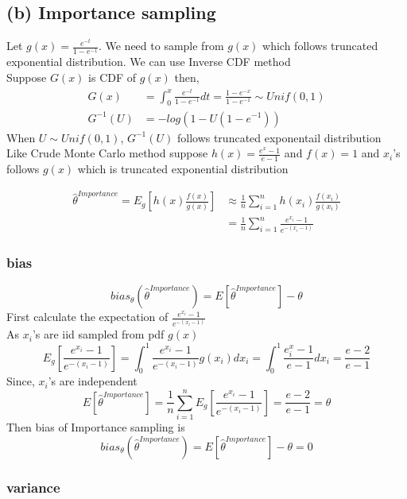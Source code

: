 \documentclass[11pt]{article}
\begin{document}
    \subsection{(b) Importance sampling}\label{b-importance-sampling}

Let \(g(x)=\frac{e^{-t}}{1-e^{-1}}\). We need to sample from \(g(x)\)
which follows truncated exponential distribution. We can use Inverse CDF
method\\
Suppose \(G(x)\) is CDF of \(g(x)\) then, \[
\begin{align*}
G(x) &= \int_{0}^{x}\frac{e^{-t}}{1-e^{-1}}dt = \frac{1 -e^{-x}}{1 -e^{-1}} \sim Unif(0,1)\\
G^{-1}(U) &= -log \left(1-U(1-e^{-1})\right)
\end{align*}
\] When \(U\sim Unif(0,1)\), \(G^{-1}(U)\) follows truncated exponentail
distribution\\
Like Crude Monte Carlo method suppose \(h(x) = \frac{e^x-1}{e-1}\) and
\(f(x) =1\) and \(x_i\)'s follows \(g(x)\) which is truncated
exponential distribution

    \[
\begin{align*}
\hat{\theta}^{Importance} = E_{g}\left[h(x)\frac{f(x)}{g(x)}\right] &\approx \frac{1}{n} \sum_{i=1}^{n}h(x_i)\frac{f(x_i)}{g(x_i)}\\
&=\frac{1}{n} \sum_{i=1}^{n}\frac{e^{x_i}-1}{e^{-(x_i-1)}}
\end{align*}
\]

    \subsubsection{bias}\label{bias}

\[
bias_\theta (\hat{\theta}^{Importance})= E[\hat{\theta}^{Importance}] - \theta
\] First calculate the expectation of
\(\frac{e^{x_i}-1}{e^{-(x_i-1)}}\)\\
As \(x_i\)'s are iid sampled from pdf \(g(x)\) \[
E_g\left[\frac{e^{x_i}-1}{e^{-(x_i-1)}}\right] =\int_{0}^{1}\frac{e^{x_i}-1}{e^{-(x_i-1)}}g(x_i)dx_i= \int_{0}^{1}\frac{e^x_i-1}{e-1}dx_i = \frac{e-2}{e-1}
\] Since, \(x_i\)'s are independent \[
E[\hat{\theta}^{Importance}] = \frac{1}{n}\sum_{i=1}^{n} E_g\left[\frac{e^{x_i}-1}{e^{-(x_i-1)}}\right] = \frac{e-2}{e-1} =\theta
\] Then bias of Importance sampling is \[
bias_\theta (\hat{\theta}^{Importance})= E[\hat{\theta}^{Importance}] - \theta = 0
\]

    \subsubsection{variance}\label{variance}
\end{document}
